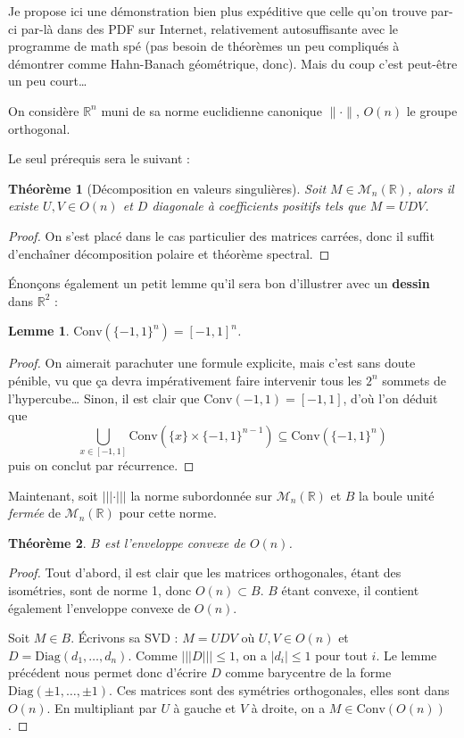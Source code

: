 \documentclass[a4paper, 11pt]{article}
\def\R{\mathbb{R}}
\def\M{\mathcal{M}}
\def\Diag{\mathrm{Diag}}
\newtheorem*{theorem}{Théorème}
\newtheorem*{lemma}{Lemme}
\begin{document}
Je propose ici une démonstration bien plus expéditive que celle qu'on trouve
par-ci par-là dans des PDF sur Internet, relativement autosuffisante avec le
programme de math spé (pas besoin de théorèmes un peu compliqués à démontrer
comme Hahn-Banach géométrique, donc). Mais du coup c'est peut-être un peu court…

On considère $\R^n$ muni de sa norme euclidienne canonique $\|\cdot\|$, $O(n)$
le groupe orthogonal.

Le seul prérequis sera le suivant :

\begin{theorem}[Décomposition en valeurs singulières]
  Soit $M \in \M_n(\R)$, alors il existe $U, V \in O(n)$ et $D$ diagonale à
  coefficients positifs tels que $M = UDV$.
\end{theorem}
\begin{proof}
  On s'est placé dans le cas particulier des matrices carrées, donc il suffit
  d'enchaîner décomposition polaire et théorème spectral.
\end{proof}

Énonçons également un petit lemme qu'il sera bon d'illustrer avec un
\textbf{dessin} dans $\R^2$ :
\begin{lemma}
  $\mathrm{Conv}(\{-1,1\}^n) = [-1,1]^n$.
\end{lemma}
\begin{proof}
  On aimerait parachuter une formule explicite, mais c'est sans doute pénible,
  vu que ça devra impérativement faire intervenir tous les $2^n$ sommets de
  l'hypercube… Sinon, il est clair que $\mathrm{Conv}({-1,1}) = [-1,1]$, d'où
  l'on déduit que
  \[ \bigcup_{x \in [-1,1]}
  \mathrm{Conv}(\{x\} \times \{-1,1\}^{n-1}) \subseteq
  \mathrm{Conv}(\{-1,1\}^n) \]
  puis on conclut par récurrence.
\end{proof}


Maintenant, soit $||| \cdot |||$ la norme subordonnée sur $\M_n(\R)$ et $B$ la
boule unité \emph{fermée} de $\M_n(\R)$ pour cette norme.

\begin{theorem}
  $B$ est l'enveloppe convexe de $O(n)$. 
\end{theorem}

\begin{proof}
  Tout d'abord, il est clair que les matrices orthogonales, étant des
  isométries, sont de norme 1, donc $O(n) \subset B$. $B$ étant convexe, il
  contient également l'enveloppe convexe de $O(n)$.

  Soit $M \in B$. Écrivons sa SVD : $M = UDV$ où $U, V \in O(n)$ et $D =
  \Diag(d_1, \ldots, d_n)$. Comme $|||D||| \leq 1$, on a $|d_i| \leq 1$ pour
  tout $i$. Le lemme précédent nous permet donc d'écrire $D$ comme barycentre de
  la forme $\Diag(\pm 1, \ldots, \pm 1)$. Ces matrices sont des symétries
  orthogonales, elles sont dans $O(n)$. En multipliant par $U$ à gauche et $V$ à
  droite, on a $M \in \mathrm{Conv}(O(n))$.
\end{proof}
\end{document}
